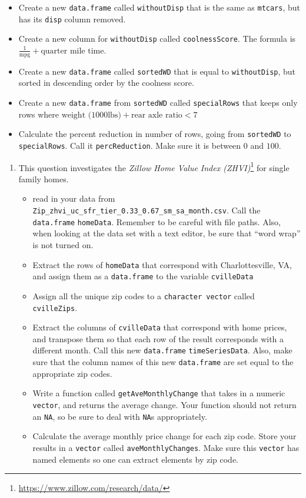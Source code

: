 \documentclass[
  12pt,
  krantz2]{krantz}
\providecommand{\tightlist}{%
  \setlength{\itemsep}{0pt}\setlength{\parskip}{0pt}}
\renewcommand{\href}[2]{#2\footnote{\url{#1}}}
\begin{document}
\begin{itemize}
\tightlist
\item
  Create a new \texttt{data.frame} called \texttt{withoutDisp} that is the same as \texttt{mtcars}, but has its \texttt{disp} column removed.
\item
  Create a new column for \texttt{withoutDisp} called \texttt{coolnessScore}. The formula is \(\frac{1}{\text{mpg}} + \text{quarter mile time}\).
\item
  Create a new \texttt{data.frame} called \texttt{sortedWD} that is equal to \texttt{withoutDisp}, but sorted in descending order by the coolness score.
\item
  Create a new \texttt{data.frame} from \texttt{sortedWD} called \texttt{specialRows} that keeps only rows where \(\text{weight (1000lbs)} + \text{rear axle ratio} < 7\)
\item
  Calculate the percent reduction in number of rows, going from \texttt{sortedWD} to \texttt{specialRows}. Call it \texttt{percReduction}. Make sure it is between \(0\) and \(100\).
\end{itemize}

\begin{enumerate}
\def\labelenumi{\arabic{enumi}.}
\setcounter{enumi}{2}
\item
  This question investigates the \href{https://www.zillow.com/research/data/}{\emph{Zillow Home Value Index (ZHVI)}} for single family homes.

  \begin{itemize}
  \tightlist
  \item
    read in your data from \texttt{Zip\_zhvi\_uc\_sfr\_tier\_0.33\_0.67\_sm\_sa\_month.csv}. Call the \texttt{data.frame} \texttt{homeData}. Remember to be careful with file paths. Also, when looking at the data set with a text editor, be sure that ``word wrap'' is not turned on.
  \item
    Extract the rows of \texttt{homeData} that correspond with Charlottesville, VA, and assign them as a \texttt{data.frame} to the variable \texttt{cvilleData}
  \item
    Assign all the unique zip codes to a \texttt{character\ vector} called \texttt{cvilleZips}.
  \item
    Extract the columns of \texttt{cvilleData} that correspond with home prices, and transpose them so that each row of the result corresponds with a different month. Call this new \texttt{data.frame} \texttt{timeSeriesData}. Also, make sure that the column names of this new \texttt{data.frame} are set equal to the appropriate zip codes.
  \item
    Write a function called \texttt{getAveMonthlyChange} that takes in a numeric \texttt{vector}, and returns the average change. Your function should not return an \texttt{NA}, so be sure to deal with \texttt{NA}s appropriately.
  \item
    Calculate the average monthly price change for each zip code. Store your results in a \texttt{vector} called \texttt{aveMonthlyChanges}. Make sure this \texttt{vector} has named elements so one can extract elements by zip code.
  \end{itemize}
\end{enumerate}
\end{document}
